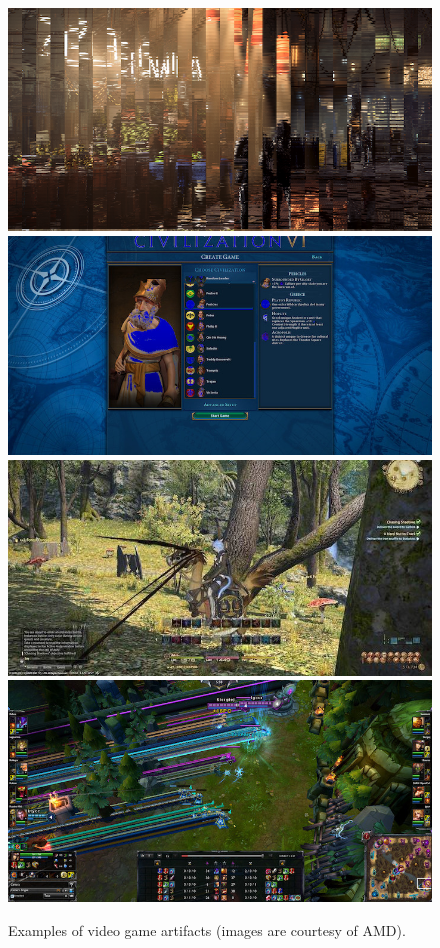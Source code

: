 \begin{figure}[h]
\centering
\includegraphics[scale=0.56]{images/bug1new.png}
\includegraphics[scale=0.283]{images/bug2new.jpg}\\
\includegraphics[scale=0.28]{images/bug3new.jpg}
\includegraphics[scale=0.28]{images/bug4new.jpg}\\
\vspace{5pt}
\caption[Examples of video game artifacts]{Examples of video game artifacts (images are courtesy of AMD).}
\label{fig:bugs}
\end{figure}

